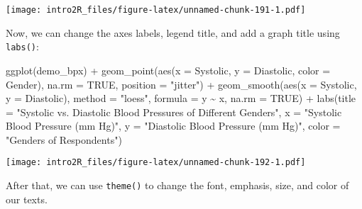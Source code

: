 \documentclass[
]{book}
\newenvironment{Shaded}{\begin{snugshade}}{\end{snugshade}}
\newcommand{\AttributeTok}[1]{\textcolor[rgb]{0.77,0.63,0.00}{#1}}
\newcommand{\ConstantTok}[1]{\textcolor[rgb]{0.00,0.00,0.00}{#1}}
\newcommand{\FunctionTok}[1]{\textcolor[rgb]{0.00,0.00,0.00}{#1}}
\newcommand{\NormalTok}[1]{#1}
\newcommand{\SpecialCharTok}[1]{\textcolor[rgb]{0.00,0.00,0.00}{#1}}
\newcommand{\StringTok}[1]{\textcolor[rgb]{0.31,0.60,0.02}{#1}}
\begin{document}
\texttt{[image: intro2R\_files/figure-latex/unnamed-chunk-191-1.pdf]}

Now, we can change the axes labels, legend title, and add a graph title using \texttt{labs()}:

\begin{Shaded}
\begin{Highlighting}[]
\FunctionTok{ggplot}\NormalTok{(demo\_bpx) }\SpecialCharTok{+}
    \FunctionTok{geom\_point}\NormalTok{(}\FunctionTok{aes}\NormalTok{(}\AttributeTok{x =}\NormalTok{ Systolic, }\AttributeTok{y =}\NormalTok{ Diastolic, }\AttributeTok{color =}\NormalTok{ Gender), }
             \AttributeTok{na.rm =} \ConstantTok{TRUE}\NormalTok{,}
             \AttributeTok{position =} \StringTok{"jitter"}\NormalTok{) }\SpecialCharTok{+}
    \FunctionTok{geom\_smooth}\NormalTok{(}\FunctionTok{aes}\NormalTok{(}\AttributeTok{x =}\NormalTok{ Systolic, }\AttributeTok{y =}\NormalTok{ Diastolic), }
                \AttributeTok{method =} \StringTok{"loess"}\NormalTok{,}
                \AttributeTok{formula =}\NormalTok{ y }\SpecialCharTok{\textasciitilde{}}\NormalTok{ x,}
                \AttributeTok{na.rm =} \ConstantTok{TRUE}\NormalTok{) }\SpecialCharTok{+}
    \FunctionTok{labs}\NormalTok{(}\AttributeTok{title =} \StringTok{"Systolic vs. Diastolic Blood Pressures of Different Genders"}\NormalTok{,}
         \AttributeTok{x =} \StringTok{"Systolic Blood Pressure (mm Hg)"}\NormalTok{, }
         \AttributeTok{y =} \StringTok{"Diastolic Blood Pressure (mm Hg)"}\NormalTok{,}
         \AttributeTok{color =} \StringTok{"Genders of Respondents"}\NormalTok{)}
\end{Highlighting}
\end{Shaded}

\texttt{[image: intro2R\_files/figure-latex/unnamed-chunk-192-1.pdf]}

After that, we can use \texttt{theme()} to change the font, emphasis, size, and color of our texts.
\end{document}
